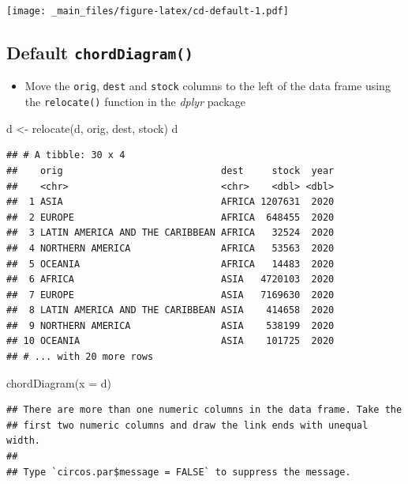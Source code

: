 \documentclass[
]{book}
\newenvironment{Shaded}{\begin{snugshade}}{\end{snugshade}}
\newcommand{\AttributeTok}[1]{\textcolor[rgb]{0.77,0.63,0.00}{#1}}
\newcommand{\FunctionTok}[1]{\textcolor[rgb]{0.00,0.00,0.00}{#1}}
\newcommand{\NormalTok}[1]{#1}
\newcommand{\OtherTok}[1]{\textcolor[rgb]{0.56,0.35,0.01}{#1}}
\providecommand{\tightlist}{%
  \setlength{\itemsep}{0pt}\setlength{\parskip}{0pt}}
\begin{document}
\texttt{[image: \_main\_files/figure-latex/cd-default-1.pdf]}

\hypertarget{default-chorddiagram-1}{%
\subsection{\texorpdfstring{Default \texttt{chordDiagram()}}{Default chordDiagram()}}\label{default-chorddiagram-1}}

\begin{itemize}
\tightlist
\item
  Move the \texttt{orig}, \texttt{dest} and \texttt{stock} columns to the left of the data frame using the \texttt{relocate()} function in the \emph{dplyr} package
\end{itemize}

\begin{Shaded}
\begin{Highlighting}[]
\NormalTok{d }\OtherTok{\textless{}{-}} \FunctionTok{relocate}\NormalTok{(d, orig, dest, stock)}
\NormalTok{d}
\end{Highlighting}
\end{Shaded}

\begin{verbatim}
## # A tibble: 30 x 4
##    orig                            dest     stock  year
##    <chr>                           <chr>    <dbl> <dbl>
##  1 ASIA                            AFRICA 1207631  2020
##  2 EUROPE                          AFRICA  648455  2020
##  3 LATIN AMERICA AND THE CARIBBEAN AFRICA   32524  2020
##  4 NORTHERN AMERICA                AFRICA   53563  2020
##  5 OCEANIA                         AFRICA   14483  2020
##  6 AFRICA                          ASIA   4720103  2020
##  7 EUROPE                          ASIA   7169630  2020
##  8 LATIN AMERICA AND THE CARIBBEAN ASIA    414658  2020
##  9 NORTHERN AMERICA                ASIA    538199  2020
## 10 OCEANIA                         ASIA    101725  2020
## # ... with 20 more rows
\end{verbatim}

\begin{Shaded}
\begin{Highlighting}[]
\FunctionTok{chordDiagram}\NormalTok{(}\AttributeTok{x =}\NormalTok{ d)}
\end{Highlighting}
\end{Shaded}

\begin{verbatim}
## There are more than one numeric columns in the data frame. Take the
## first two numeric columns and draw the link ends with unequal width.
## 
## Type `circos.par$message = FALSE` to suppress the message.
\end{verbatim}
\end{document}
